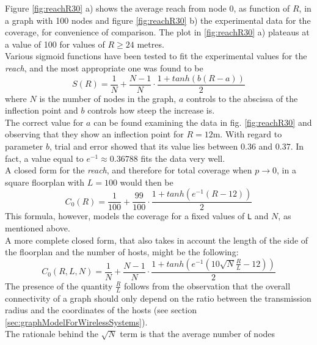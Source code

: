 \hfill \break
\hfill \break
Figure \ref{fig:reachR30} a) shows the average reach from node 0, as function of
$R$, in a graph with 100 nodes and figure \ref{fig:reachR30} b) the experimental
data for the coverage, for convenience of comparison. The plot in \ref{fig:reachR30}
a)  plateaus at a value of 100 for values of $R \geq24$ metres.\\
Various sigmoid functions have been tested to fit the experimental values for
the \textit{reach}, and the most appropriate one was found to be
\hfill \break
\begin{equation}\label{eq:reachSigmoidParametric}
	S(R) = \frac{1}{N} + \frac{N-1}{N}\cdot\frac{1+tanh(b(R-a))}{2}
\end{equation}
\hfill \break
where $N$ is the number of nodes in the graph, $a$ controls to the abscissa of
the inflection point and $b$ controls how steep the increase is.\\
The correct value for $a$ can be found examining the data in fig.
\ref{fig:reachR30} and observing that they show an inflection point for
$R = 12$m. With regard to parameter $b$, trial and error showed that its value
lies between $0.36$ and $0.37$. In fact, a value equal to $e^{-1} \approx 0.36788$
fits the data very well.\\
A closed form for the \textit{reach}, and therefore for total coverage when
$p \to 0$, in a square floorplan with $L=100$ would then be
\hfill \break
\begin{equation}\label{eq:reachSigmoidNoL}
	C_{0}(R) = \frac{1}{100} + \frac{99}{100}\cdot\frac{1+tanh(e^{-1}(R - 12))}{2}
\end{equation}
\hfill \break
This formula, however, models the coverage for a fixed values of \texttt{L} and
$N$, as mentioned above.\\
A more complete closed form, that also takes in account the length of the side
of the floorplan and the number of hosts, might be the following:
\hfill \break
\begin{equation}\label{eq:reachSigmoidL}
	C_{0}(R, L, N) = \frac{1}{N} + \frac{N-1}{N}\cdot\frac{1+tanh(e^{-1}(10\sqrt{N}\frac{R}{L} - 12))}{2}
\end{equation}
\hfill \break
The presence of the quantity $\frac{R}{L}$ follows from the observation that
the overall connectivity of a graph should only depend on the ratio between the
transmission radius and the coordinates of the hosts (see section \ref{sec:graphModelForWirelessSystems}).\\
The rationale behind the $\sqrt{N}$ term is that the average number of nodes
